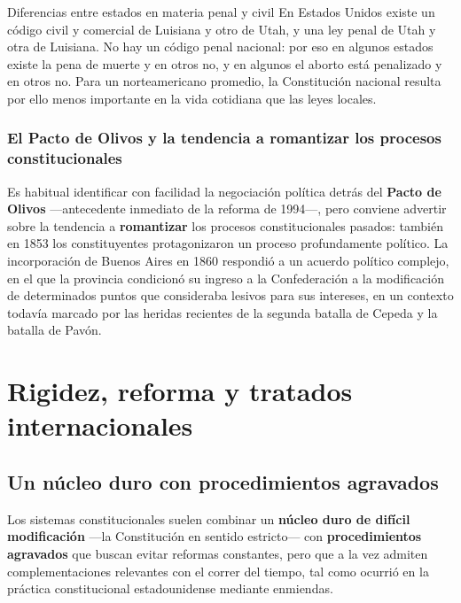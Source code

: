 \documentclass[12pt,oneside]{book}
\begin{document}
\begin{example}{Diferencias entre estados en materia penal y civil}
En Estados Unidos existe un código civil y comercial de Luisiana y otro de Utah, y una ley penal de Utah y otra de Luisiana. No hay un código penal nacional: por eso en algunos estados existe la pena de muerte y en otros no, y en algunos el aborto está penalizado y en otros no. Para un norteamericano promedio, la Constitución nacional resulta por ello menos importante en la vida cotidiana que las leyes locales.
\end{example}

\subsection{El Pacto de Olivos y la tendencia a romantizar los procesos constitucionales}

Es habitual identificar con facilidad la negociación política detrás del \textbf{Pacto de Olivos} ---antecedente inmediato de la reforma de 1994---, pero conviene advertir sobre la tendencia a \textbf{romantizar} los procesos constitucionales pasados: también en 1853 los constituyentes protagonizaron un proceso profundamente político. La incorporación de Buenos Aires en 1860 respondió a un acuerdo político complejo, en el que la provincia condicionó su ingreso a la Confederación a la modificación de determinados puntos que consideraba lesivos para sus intereses, en un contexto todavía marcado por las heridas recientes de la segunda batalla de Cepeda y la batalla de Pavón.

\chapter{Rigidez, reforma y tratados internacionales}

\section{Un núcleo duro con procedimientos agravados}

Los sistemas constitucionales suelen combinar un \textbf{núcleo duro de difícil modificación} ---la Constitución en sentido estricto--- con \textbf{procedimientos agravados} que buscan evitar reformas constantes, pero que a la vez admiten complementaciones relevantes con el correr del tiempo, tal como ocurrió en la práctica constitucional estadounidense mediante enmiendas.
\end{document}
